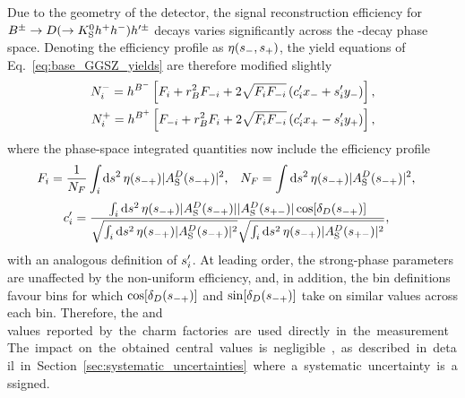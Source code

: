 Due to the geometry of the \lhcb detector, the signal reconstruction efficiency for ${{B}^\pm}\rightarrow{\ensuremath{D}}(\rightarrow{\ensuremath{{K}^0_{\mathrm{S}}}} h^+h^-)h'^\pm$ decays varies significantly across the \D-decay phase space. Denoting the efficiency profile as $\eta(s_-, s_+)$, the yield equations of Eq.~\eqref{eq:base_GGSZ_yields} are therefore modified slightly
\begin{align}
\begin{split}    \label{eq:lhcb_GGSZ_yields}
    N^-_i = h^{{{B}^-}} \left[F_i + r_{B}^2F_{-i} + 2\sqrt{F_iF_{-i}}\left(c_i'x_-+s_i'y_-\right)\right], \\
    N^+_i = h^{{{B}^+}} \left[F_{-i} + r_{B}^2F_i + 2\sqrt{F_iF_{-i}}\left(c_i'x_+-s_i'y_+\right)\right],
\end{split}
\end{align}
where the phase-space integrated quantities now include the efficiency profile
\begin{align}\label{eq:Fi_def}
    F_i &= \frac{1}{N_F}\int_i\text{d}s^2 \,\eta(s_{-+})|A_{\rm S}^{D}(s_{-+})|^2, &
    N_F &=\int\text{d}s^2 \,\eta(s_{-+})|A_{\rm S}^{D}(s_{-+})|^2,
\end{align}
\begin{align}\label{eq:ci_si_with_eff}
\begin{split}
    c_i' &= \frac
    {\int_i \text{d}s^2 \,\eta(s_{-+})|A_{\rm S}^{D}(s_{-+})||A_{\rm S}^{D}(s_{+-})|\cos[\delta_D(s_{-+})]}
    {\sqrt{\int_i \text{d}s^2 \,\eta(s_{-+})|A_{\rm S}^{D}(s_{-+})|^2}\sqrt{\int_i \text{d}s^2 \,\eta(s_{-+})|A_{\rm S}^{D}(s_{+-})|^2}},
\end{split}
\end{align}
with an analogous definition of $s_i'$. At leading order, the strong-phase parameters are unaffected by the non-uniform efficiency, and, in addition, the bin definitions favour bins for which $\cos[\delta_D(s_{-+})]$ and $\sin[\delta_D(s_{-+})]$ take on similar values across each bin.  Therefore, the  \ci and \si values reported by the charm factories are used directly in the measurement. The impact on the obtained central values is negligible, as described in detail in Section~\ref{sec:systematic_uncertainties} where a systematic uncertainty is assigned. 

